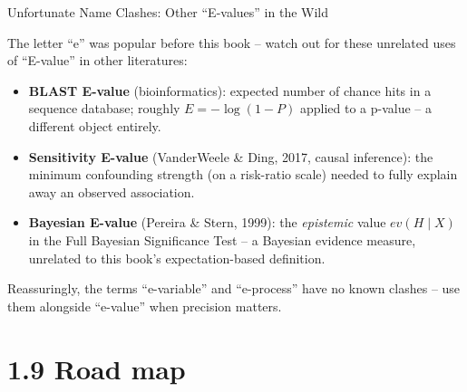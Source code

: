 \documentclass[aspectratio=169,10pt]{beamer}
\begin{document}
\begin{frame}{Unfortunate Name Clashes: Other ``E-values'' in the Wild}

The letter ``e'' was popular before this book -- watch out for these
unrelated uses of ``E-value'' in other literatures:

\begin{itemize}
  \item \textbf{BLAST E-value} (bioinformatics): expected number of chance
    hits in a sequence database; roughly $E=-\log(1-P)$ applied to a
    p-value -- a different object entirely.
  \item \textbf{Sensitivity E-value} (VanderWeele \& Ding, 2017, causal
    inference): the minimum confounding strength (on a risk-ratio scale)
    needed to fully explain away an observed association.
  \item \textbf{Bayesian E-value} (Pereira \& Stern, 1999): the
    \emph{epistemic} value $ev(H\mid X)$ in the Full Bayesian Significance
    Test -- a Bayesian evidence measure, unrelated to this book's
    expectation-based definition.
\end{itemize}

\medskip
Reassuringly, the terms ``e-variable'' and ``e-process'' have no known
clashes -- use them alongside ``e-value'' when precision matters.

\end{frame}

\section{1.9 Road map}
\end{document}
